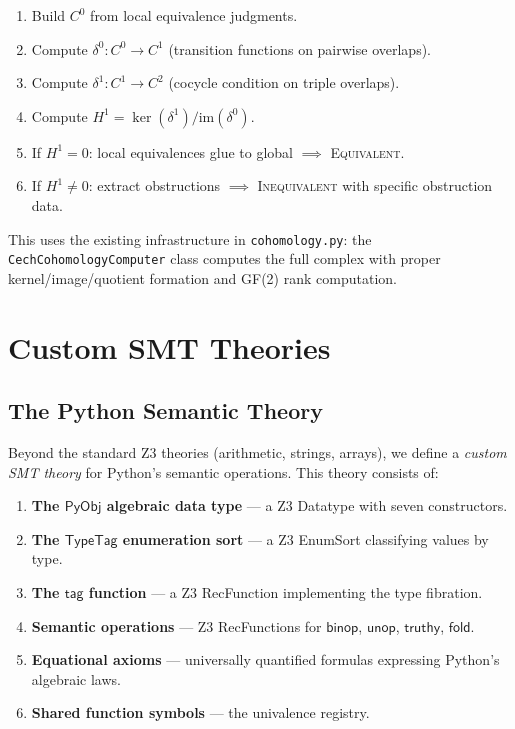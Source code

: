 \documentclass[11pt,a4paper]{report}
\theoremstyle{definition}
\theoremstyle{plain}
\newcommand{\PyObj}{\mathsf{PyObj}}
\newcommand{\fold}{\mathsf{fold}}
\newcommand{\Hone}{H^1}
\begin{document}
\begin{enumerate}
  \item Build $C^0$ from local equivalence judgments.
  \item Compute $\delta^0 : C^0 \to C^1$ (transition functions on
    pairwise overlaps).
  \item Compute $\delta^1 : C^1 \to C^2$ (cocycle condition on
    triple overlaps).
  \item Compute $\Hone = \ker(\delta^1) / \mathrm{im}(\delta^0)$.
  \item If $\Hone = 0$: local equivalences glue to global
    $\implies$ \textsc{Equivalent}.
  \item If $\Hone \neq 0$: extract obstructions $\implies$
    \textsc{Inequivalent} with specific obstruction data.
\end{enumerate}

This uses the existing infrastructure in \texttt{cohomology.py}:
the \texttt{CechCohomologyComputer} class computes the full complex
with proper kernel/image/quotient formation and GF(2) rank computation.


\chapter{Custom SMT Theories}
\label{ch:smt}

\section{The Python Semantic Theory}

Beyond the standard Z3 theories (arithmetic, strings, arrays), we
define a \emph{custom SMT theory} for Python's semantic operations.
This theory consists of:

\begin{enumerate}
  \item \textbf{The $\PyObj$ algebraic data type} --- a Z3 Datatype
    with seven constructors.
  \item \textbf{The $\mathsf{TypeTag}$ enumeration sort} --- a Z3
    EnumSort classifying values by type.
  \item \textbf{The $\mathsf{tag}$ function} --- a Z3 RecFunction
    implementing the type fibration.
  \item \textbf{Semantic operations} --- Z3 RecFunctions for
    $\mathsf{binop}$, $\mathsf{unop}$, $\mathsf{truthy}$, $\fold$.
  \item \textbf{Equational axioms} --- universally quantified formulas
    expressing Python's algebraic laws.
  \item \textbf{Shared function symbols} --- the univalence registry.
\end{enumerate}
\end{document}
